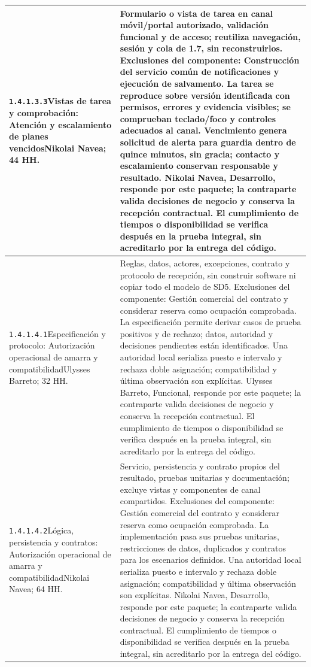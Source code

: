 \begin{longtable}{L{52mm}L{91mm}}
\texttt{1.\allowbreak{}4.\allowbreak{}1.\allowbreak{}3.\allowbreak{}3}\newline Vistas de tarea y comprobación: Atención y escalamiento de planes vencidos\newline Nikolai Navea; 44 HH. & Formulario o vista de tarea en canal móvil/portal autorizado, validación funcional y de acceso; reutiliza navegación, sesión y cola de 1.7, sin reconstruirlos. Exclusiones del componente: Construcción del servicio común de notificaciones y ejecución de salvamento. La tarea se reproduce sobre versión identificada con permisos, errores y evidencia visibles; se comprueban teclado/foco y controles adecuados al canal. Vencimiento genera solicitud de alerta para guardia dentro de quince minutos, sin gracia; contacto y escalamiento conservan responsable y resultado. Nikolai Navea, Desarrollo, responde por este paquete; la contraparte valida decisiones de negocio y conserva la recepción contractual. El cumplimiento de tiempos o disponibilidad se verifica después en la prueba integral, sin acreditarlo por la entrega del código.\\\hline
\texttt{1.\allowbreak{}4.\allowbreak{}1.\allowbreak{}4.\allowbreak{}1}\newline Especificación y protocolo: Autorización operacional de amarra y compatibilidad\newline Ulysses Barreto; 32 HH. & Reglas, datos, actores, excepciones, contrato y protocolo de recepción, sin construir software ni copiar todo el modelo de SD5. Exclusiones del componente: Gestión comercial del contrato y considerar reserva como ocupación comprobada. La especificación permite derivar casos de prueba positivos y de rechazo; datos, autoridad y decisiones pendientes están identificados. Una autoridad local serializa puesto e intervalo y rechaza doble asignación; compatibilidad y última observación son explícitas. Ulysses Barreto, Funcional, responde por este paquete; la contraparte valida decisiones de negocio y conserva la recepción contractual. El cumplimiento de tiempos o disponibilidad se verifica después en la prueba integral, sin acreditarlo por la entrega del código.\\\hline
\texttt{1.\allowbreak{}4.\allowbreak{}1.\allowbreak{}4.\allowbreak{}2}\newline Lógica, persistencia y contratos: Autorización operacional de amarra y compatibilidad\newline Nikolai Navea; 64 HH. & Servicio, persistencia y contrato propios del resultado, pruebas unitarias y documentación; excluye vistas y componentes de canal compartidos. Exclusiones del componente: Gestión comercial del contrato y considerar reserva como ocupación comprobada. La implementación pasa sus pruebas unitarias, restricciones de datos, duplicados y contratos para los escenarios definidos. Una autoridad local serializa puesto e intervalo y rechaza doble asignación; compatibilidad y última observación son explícitas. Nikolai Navea, Desarrollo, responde por este paquete; la contraparte valida decisiones de negocio y conserva la recepción contractual. El cumplimiento de tiempos o disponibilidad se verifica después en la prueba integral, sin acreditarlo por la entrega del código.\\\hline

\end{longtable}

